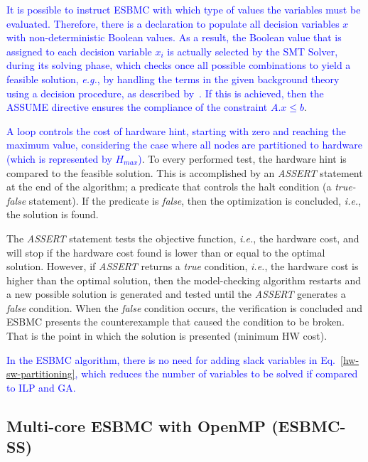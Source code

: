 \documentclass{doublecol-new}
\theoremstyle{TH}{
\newtheorem{lemma}{Lemma}
\newtheorem{theorem}[lemma]{Theorem}
\newtheorem{corrolary}[lemma]{Corrolary}
\newtheorem{conjecture}[lemma]{Conjecture}
\newtheorem{proposition}[lemma]{Proposition}
\newtheorem{claim}[lemma]{Claim}
\newtheorem{stheorem}[lemma]{Wrong Theorem}
\newtheorem{algorithm}{Algorithm}
}
\theoremstyle{THrm}{
\newtheorem{definition}{Definition}[section]
\newtheorem{question}{Question}[section]
\newtheorem{remark}{Remark}
\newtheorem{scheme}{Scheme}
}
\theoremstyle{THhit}{
\newtheorem{case}{Case}[section]
}
\begin{document}
\vspace{2 mm}
\textcolor{blue}{It is possible to instruct ESBMC with which type of values the variables must be evaluated. Therefore, there is a declaration to populate all decision variables $x$ with non-deterministic Boolean values. As a result, the Boolean value that is assigned to each decision variable $x_i$ is actually selected by the SMT Solver, during its solving phase, which checks once all possible combinations to yield a feasible solution, {\it e.g.}, by handling the terms in the given background theory using a decision procedure, as described by~\cite{DeMoura2008,Brummayer2009}. If this is achieved, then the ASSUME directive ensures the compliance of the constraint $A.x \leq b$}.

\textcolor{blue}{A loop controls the cost of hardware hint, starting with zero and reaching the maximum value, considering the case where all nodes are partitioned to hardware (which is represented by $H_{max}$)}. To every performed test, the hardware hint is compared to the feasible solution. This is accomplished by an \textit{ASSERT} statement at the end of the algorithm; a predicate that controls the halt condition (a \textit{true-false} statement). If the predicate is \textit{false}, then the optimization is concluded, {\it i.e.}, the solution is found. 

The \textit{ASSERT} statement tests the objective function, {\it i.e.}, the hardware cost, and will stop if the hardware cost found is lower than or equal to the optimal solution. However, if \textit{ASSERT} returns a \textit{true} condition, {\it i.e.}, the hardware cost is higher than the optimal solution, then the model-checking algorithm restarts and a new possible solution is generated and tested until the \textit{ASSERT} generates a \textit{false} condition. When the \textit{false} condition occurs, the verification is concluded and ESBMC presents the counterexample that caused the condition to be broken. That is the point in which the solution is presented (minimum HW cost).

\textcolor{blue}{In the ESBMC algorithm, there is no need for adding slack variables in Eq.~\eqref{hw-sw-partitioning}, which reduces the number of variables to be solved if compared to ILP and GA.}

\subsection{Multi-core ESBMC with OpenMP (ESBMC-SS)}
\label{Multi-core-ESBMC-with-OpenMP}
\end{document}
